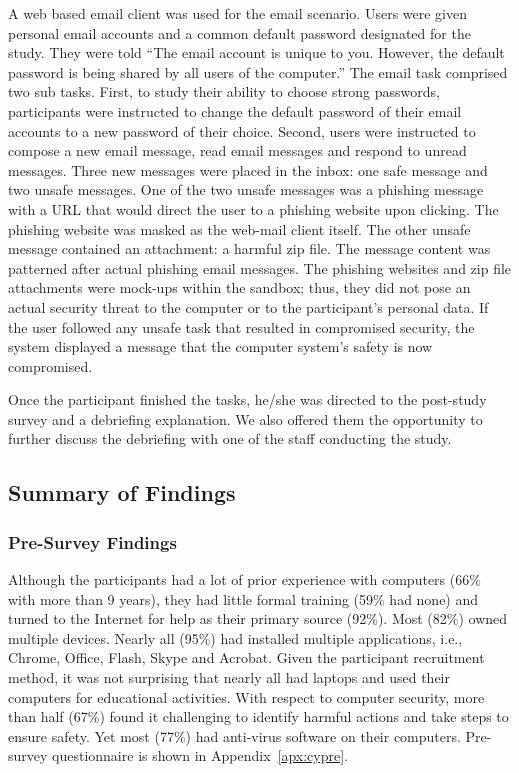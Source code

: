 \documentclass[doctor]{thesis} %
\theoremstyle{plain}
\begin{document}
A web based email client was used for the email scenario. Users were given personal email accounts and a common default password designated for the study. They were told ``The email account is unique to you. However, the default password is being shared by all users of the computer.'' The email task comprised two sub tasks. First, to study their ability to choose strong passwords, participants were instructed to change the default password of their email accounts to a new password of their choice. Second, users were instructed to compose a new email message, read email messages and respond to unread messages. Three new messages were placed in the inbox: one safe message and two unsafe messages. One of the two unsafe messages was a phishing message with a URL that would direct the user to a phishing website upon clicking. The phishing website was masked as the web-mail client itself. The other unsafe message contained an attachment: a harmful zip file. The message content was patterned after actual phishing email messages. The phishing websites and zip file attachments were mock-ups within the sandbox; thus, they did not pose an actual security threat to the computer or to the participant's personal data. 
If the user followed any unsafe task that resulted in compromised security, the system displayed a message that the computer system's safety is now compromised.


Once the participant finished the tasks, he/she was directed to the post-study survey and a debriefing explanation. We also offered them the opportunity to further discuss the debriefing with one of the staff conducting the study.


\subsection*{Summary of Findings}
\subsubsection*{Pre-Survey Findings}
Although the participants had a lot of prior experience with computers (66\% with more than 9 years), they had little formal training (59\% had none) and turned to the Internet for help as their primary source (92\%). Most (82\%) owned multiple devices. Nearly all (95\%) had installed multiple applications, i.e., Chrome, Office, Flash, Skype and Acrobat. Given the participant recruitment method, it was not surprising that nearly all had laptops and used their computers for educational activities. With respect to computer security, more than half (67\%) found it challenging to identify harmful actions and take steps to ensure safety. Yet most (77\%) had anti-virus software on their computers. Pre-survey questionnaire is shown in Appendix~\ref{apx:cypre}.
\end{document}
